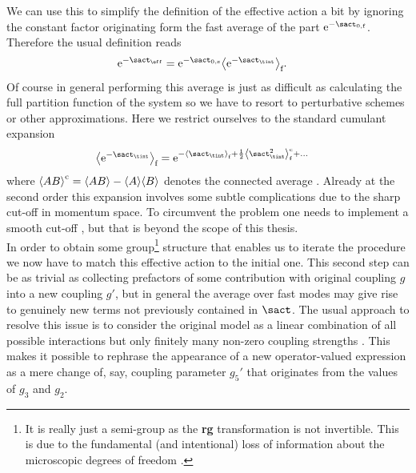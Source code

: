\documentclass[english, parskip=full]{scrartcl}
\renewcommand{\gls}[1]{\textbf{#1}}
\newcommand{\tpspace}{momentum space}
\begin{document}
We can use this to simplify the definition of the effective action a bit by ignoring the constant factor originating form the fast average of the part $\powe{-\sact_{0,\f}}$.
Therefore the usual definition reads \cite[]{Bosonization_Shankar_1994} %
\begin{align}
\powe{-\sact_\eff} &= \powe{-\sact_{0,\s}} \bra*{\powe{-\sact_\tint}}_\f. \label{eqn:rg:effective_S_Wilson_def}
\end{align}
Of course in general performing this average is just as difficult as calculating the full partition function of the system so we have to resort to perturbative schemes or other approximations.
Here we restrict ourselves to the standard cumulant expansion
\begin{align*}
\bra*{\powe{-\sact_\tint}}_\f &= \powe{-\bra*{\sact_\tint}_\f + \frac{1}{2} \bra*{\sact_\tint^2}_\f^\c + \dots}
\end{align*}
where $\bra*{AB}^\c = \bra*{AB} - \bra*{A}\bra*{B}$ denotes the connected average \cite{RG_Wilson_SmoothCutoff_Nozieres_1987}.
Already at the second order this expansion involves some subtle complications due to the sharp cut-off in \tpspace{}.
To circumvent the problem one needs to implement a smooth cut-off \cites{RG_SG_Wilson_Sharp_vs_Smooth_Kogut_1979}{RG_Wilson_SmoothCutoff_Nozieres_1987}[]{RG_QFT_Dupuis_2023}, but that is beyond the scope of this thesis.\\
In order to obtain some group\footnote{It is really just a semi-group as the \gls{rg} transformation is not invertible. This is due to the fundamental (and intentional) loss of information about the microscopic degrees of freedom \cite[]{RG_Theory_Fisher_1998}.} structure that enables us to iterate the procedure we now have to match this effective action to the initial one.
This second step can be as trivial as collecting prefactors of some contribution with original coupling $g$ into a new coupling $g'$, but in general the average over fast modes may give rise to genuinely new terms not previously contained in $\sact$.
The usual approach to resolve this issue is to consider the original model as a linear combination of all possible interactions but only finitely many non-zero coupling strengths \cite[]{Fradkin_2013}. %
This makes it possible to rephrase the appearance of a new operator-valued expression as a mere change of, say, coupling parameter $g_5'$ that originates from the values of $g_3$ and $g_2$.\\
\end{document}
